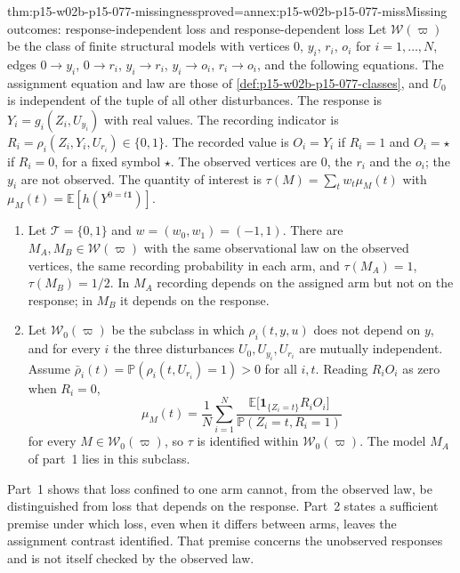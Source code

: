 \begin{hbtheorem}{thm:p15-w02b-p15-077-missingness}{proved=annex:p15-w02b-p15-077-miss}{Missing outcomes: response-independent loss and response-dependent loss}
Let \(\mathcal W(\varpi)\) be the class of finite structural models with
vertices \(0\), \(y_i\), \(r_i\), \(o_i\) for \(i=1,\ldots,N\), edges
\(0\to y_i\), \(0\to r_i\), \(y_i\to r_i\), \(y_i\to o_i\),
\(r_i\to o_i\), and the following equations. The assignment equation and
law are those of \cref{def:p15-w02b-p15-077-classes}, and \(U_0\) is
independent of the tuple of all other disturbances. The response is
\(Y_i=g_i(Z_i,U_{y_i})\) with real values. The recording indicator is
\(R_i=\rho_i(Z_i,Y_i,U_{r_i})\in\{0,1\}\). The recorded value is
\(O_i=Y_i\) if \(R_i=1\) and \(O_i=\star\) if \(R_i=0\), for a fixed
symbol \(\star\). The observed vertices are \(0\), the \(r_i\) and the
\(o_i\); the \(y_i\) are not observed. The quantity of interest is
\(\tau(M)=\sum_tw_t\mu_M(t)\) with
\(\mu_M(t)=\mathbb E[h(Y^{0=t\mathbf 1})]\).
\begin{enumerate}
\item Let \(\mathcal T=\{0,1\}\) and \(w=(w_0,w_1)=(-1,1)\). There are
      \(M_A,M_B\in\mathcal W(\varpi)\) with the same observational law on
      the observed vertices, the same recording probability in each arm,
      and \(\tau(M_A)=1\), \(\tau(M_B)=1/2\). In \(M_A\) recording
      depends on the assigned arm but not on the response; in \(M_B\) it
      depends on the response.
\item Let \(\mathcal W_0(\varpi)\) be the subclass in which
      \(\rho_i(t,y,u)\) does not depend on \(y\), and for every \(i\) the
      three disturbances \(U_0,U_{y_i},U_{r_i}\) are mutually independent.
      Assume \(\bar\rho_i(t)=\mathbb P(\rho_i(t,U_{r_i})=1)>0\) for all
      \(i,t\). Reading \(R_iO_i\) as zero when \(R_i=0\),
      \[
       \mu_M(t)=\frac1N\sum_{i=1}^N
        \frac{\mathbb E\bigl[\mathbf 1_{\{Z_i=t\}}R_iO_i\bigr]}
             {\mathbb P(Z_i=t,R_i=1)}
      \]
      for every \(M\in\mathcal W_0(\varpi)\), so \(\tau\) is identified
      within \(\mathcal W_0(\varpi)\). The model \(M_A\) of part~1 lies in
      this subclass.
\end{enumerate}
\end{hbtheorem}

Part~1 shows that loss confined to one arm cannot, from the observed law,
be distinguished from loss that depends on the response. Part~2 states a
sufficient premise under which loss, even when it differs between arms,
leaves the assignment contrast identified. That premise concerns the
unobserved responses and is not itself checked by the observed law.

